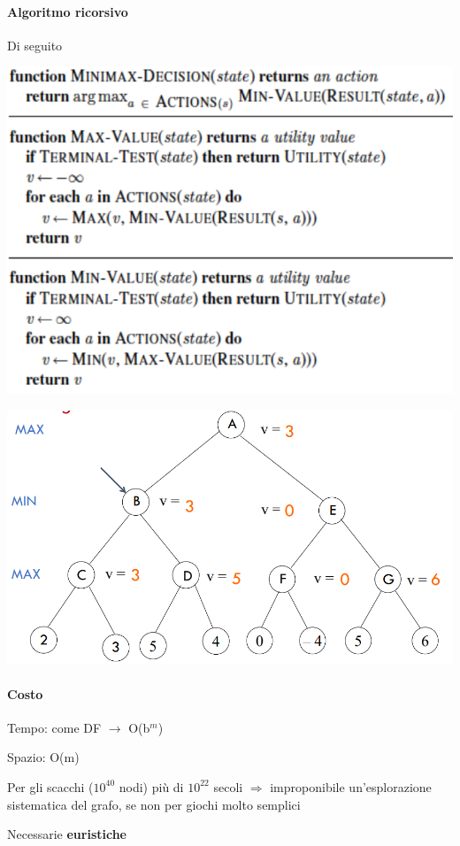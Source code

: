 \documentclass[10pt]{book}
\begin{document}
\paragraph{Algoritmo ricorsivo} Di seguito
\begin{center}
	\includegraphics[scale=0.7]{minimaxricorsivo.png}
\end{center}
\begin{center}
	\includegraphics[scale=0.7]{minimaxes.png}
\end{center}
\paragraph{Costo}
\begin{list}{}{}
	\item Tempo: come DF $\rightarrow$ O(b$^m$)
	\item Spazio: O(m)
	\item Per gli scacchi ($10^{40}$ nodi) più di $10^{22}$ secoli $\Rightarrow$ improponibile un'esplorazione sistematica del grafo, se non per giochi molto semplici
	\item Necessarie \textbf{euristiche}
\end{list}
\pagebreak
\end{document}
